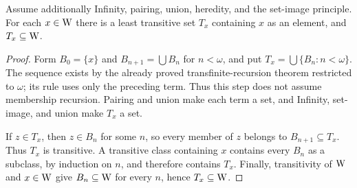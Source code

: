 \begin{lemma}
Assume additionally Infinity, pairing, union, heredity, and the set-image
principle. For each $x\in\mathrm{W}$ there is a least transitive set $T_x$
containing $x$ as an element, and $T_x\subseteq\mathrm{W}$.
\end{lemma}
\begin{proof}
Form $B_0=\{x\}$ and $B_{n+1}=\bigcup B_n$ for $n<\omega$, and put
$T_x=\bigcup\{B_n:n<\omega\}$. The sequence exists by the already
proved transfinite-recursion theorem restricted to $\omega$; its rule
uses only the preceding term. Thus this step does not assume membership
recursion. Pairing and union make each term a set, and Infinity,
set-image, and union make $T_x$ a set.

If $z\in T_x$, then $z\in B_n$ for some $n$, so every member of $z$
belongs to $B_{n+1}\subseteq T_x$. Thus $T_x$ is transitive. A transitive
class containing $x$ contains every $B_n$ as a subclass, by induction on
$n$, and therefore contains $T_x$. Finally, transitivity of $\mathrm{W}$ and
$x\in\mathrm{W}$ give $B_n\subseteq\mathrm{W}$ for every $n$, hence $T_x\subseteq\mathrm{W}$.
\end{proof}

